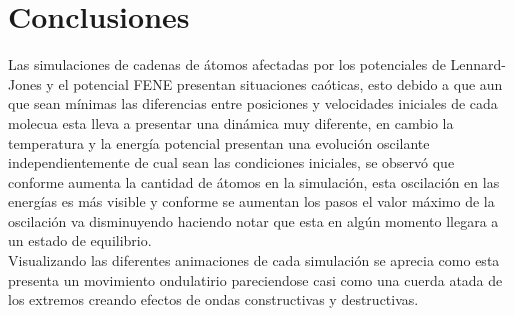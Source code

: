 \section{Conclusiones}
Las simulaciones de cadenas de átomos afectadas por los potenciales de Lennard-Jones y el potencial FENE
presentan situaciones caóticas, esto debido a que aun que sean mínimas las diferencias entre posiciones y velocidades iniciales de 
cada molecua esta lleva a presentar una dinámica muy diferente, en cambio la temperatura y la energía potencial 
presentan una evolución oscilante independientemente de cual sean las condiciones iniciales, se observó que conforme aumenta la cantidad de 
átomos en la simulación, esta oscilación en las energías es más visible y conforme se aumentan los pasos el valor máximo de la oscilación va disminuyendo
haciendo notar que esta en algún momento llegara a un estado de equilibrio.\\
Visualizando las diferentes animaciones de cada simulación se aprecia como esta presenta un movimiento ondulatirio pareciendose casi como una cuerda atada de los extremos
creando efectos de ondas constructivas y destructivas.